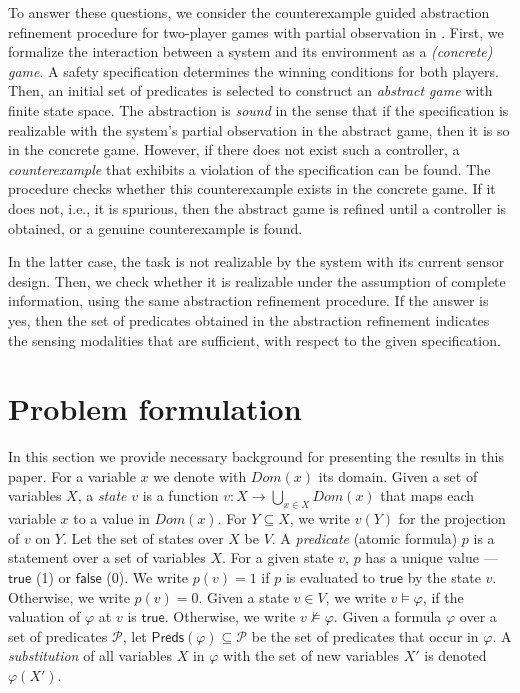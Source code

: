 \documentclass[letterpaper, 10 pt, conference]{ieeeconf}
\newcommand{\truev}{\mathsf{true}}
\newcommand{\falsev}{\mathsf{false}}
\begin{document}
To answer these questions, we consider the counterexample guided
abstraction refinement procedure for two-player games with partial
observation in \cite{DimitrovaF08} . First, we formalize the interaction between a system
and its environment as a \emph{(concrete) game}.  A
safety specification determines the winning conditions for both
players. Then, an initial set of  predicates is selected to construct an
\emph{abstract game} with finite state space. The abstraction is
\emph{sound} in the sense that if the specification is realizable with the
system's partial observation in the abstract game, then it is so in
the concrete game.  However, if there does not exist such a
controller, a \emph{counterexample} that exhibits a violation of the
specification can be found. The procedure checks whether
this counterexample exists in the concrete game. If it does not, i.e., it is 
spurious, then the abstract game is refined until a
controller is obtained, or a genuine counterexample is found.

In the latter case, the task is not realizable by the system with its
current sensor design.  Then, we check whether it is realizable under
the assumption of complete information, using the same abstraction
refinement procedure. If the answer is yes, then the set of predicates
obtained in the abstraction refinement indicates the sensing
modalities that are sufficient, with respect to the given specification.

\section{Problem formulation}
\label{sec:problemformulation}


In this section we provide necessary background for presenting the
results in this paper.  
For a variable $x$ we denote with $Dom(x)$ its domain. Given a set of
variables $X$, a \emph{state} $v$ is a function $v: X \rightarrow
\bigcup_{x\in X} Dom(x)$ that maps each variable $x$ to a value in
$Dom(x)$. For $Y \subseteq X$, we write $v(Y)$ for the projection
of $v$ on $Y$.  Let the set of states over $X$ be $V$.  A
\emph{predicate} (atomic formula) $p$ is a statement over a set of variables $X$.  For
a given state $v$, $p$ has a unique value ---$\truev$ (1) or $\falsev$
 (0). We write $p(v)=1$ if $p$ is evaluated to $\truev$ by the state
 $v$. Otherwise, we write $p(v)=0$. Given a state $v \in V$, we write $v\models \varphi$, if the valuation of
$\varphi$ at $v$ is $\truev$. Otherwise, we write $v\not \models
\varphi$.
Given a formula $\varphi$ over a
set of predicates $\mathcal{P}$, let $\mathsf{Preds}(\varphi)\subseteq
\mathcal{P}$ be the set of predicates that occur in $\varphi$. 
 A \emph{substitution} of all variables $X$ in $\varphi$ with
the set of new variables $X'$ is denoted $\varphi(X')$.
\end{document}
